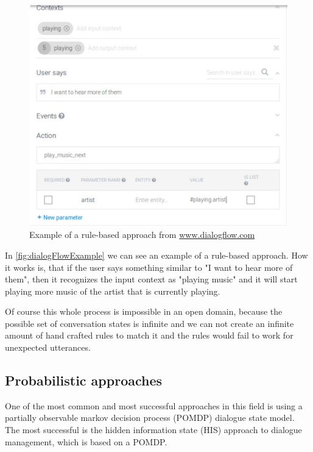 \documentclass[conference]{IEEEtran}
\begin{document}
\begin{figure}[H]
\centering
   \includegraphics[width=\linewidth]{ruleBasedDialogflow.jpg}
  \caption{Example of a rule-based approach from \url{www.dialogflow.com}}
  \label{fig:dialogFlowExample}
\end{figure}

In \autoref{fig:dialogFlowExample} we can see an example of a rule-based approach. How it works is, that if the user says something similar to "I want to hear more of them", then it recognizes the input context as "playing music" and it will start playing more music of the artist that is currently playing.

Of course this whole process is impossible in an open domain, because the possible set of conversation states is infinite and we can not create an infinite amount of hand crafted rules to match it and the rules would fail to work for unexpected utterances\cite{wallace2009anatomy}.

\subsection{Probabilistic approaches}
One of the most common and most successful approaches in this field is using a partially observable markov decision process (POMDP)\cite{kaelbling1998planning,young2013pomdp} dialogue state model. The most successful is the hidden information state (HIS) approach to dialogue management\cite{young2007hidden,young2010hidden}, which is based on a POMDP.
\end{document}
